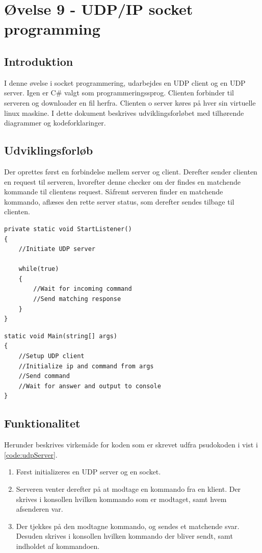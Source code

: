 \section{Øvelse 9 - UDP/IP socket programming}

\subsection{Introduktion}
I denne øvelse i socket programmering, udarbejdes en UDP client og en UDP server. Igen er C\# valgt som programmeringssprog. Clienten forbinder til serveren og downloader en fil herfra. Clienten o server køres på hver sin virtuelle linux maskine. I dette dokument beskrives udviklingsforløbet med tilhørende diagrammer og kodeforklaringer.

\subsection{Udviklingsforløb}
Der oprettes først en forbindelse mellem server og client. Derefter sender clienten en request til serveren, hvorefter denne checker om der findes en matchende kommande til clientens request.
Såfremt serveren finder en matchende kommando, aflæses den rette server status, som derefter sendes tilbage til clienten.

\begin{lstlisting}[caption = Hoveddesign for server,label=code:udpServer]
private static void StartListener() 
{
	//Initiate UDP server
	
	while(true) 
	{
		//Wait for incoming command
		//Send matching response
	}
}
\end{lstlisting}

\begin{lstlisting}[caption = Hoveddesign for client,label=code:udpClient]
static void Main(string[] args)
{
	//Setup UDP client
	//Initialize ip and command from args
	//Send command
	//Wait for answer and output to console
}
\end{lstlisting}

\subsection{Funktionalitet}
Herunder beskrives virkemåde for koden som er skrevet udfra psudokoden i vist i \ref{code:udpServer}.

\begin{enumerate}
	\item Først initializeres en UDP server og en socket.
	\item Serveren venter derefter på at modtage en kommando fra en klient. Der skrives i konsollen hvilken
	kommando som er modtaget, samt hvem afsenderen var.
	\item Der tjekkes på den modtagne kommando, og sendes et matchende svar. Desuden skrives i konsollen
	hvilken kommando der bliver sendt, samt indholdet af kommandoen.
\end{enumerate}


